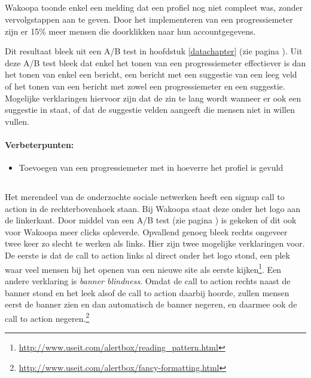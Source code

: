 \documentclass[a4paper, 10pt, pdftex]{report}
\begin{document}
    \subsection{\cite{Brouns2008}}
    \label{wak:Brouns2008}
    Wakoopa toonde enkel een melding dat een profiel nog niet compleet was, zonder vervolgstappen aan te geven. Door het implementeren van een progressiemeter zijn er 15\% meer mensen die doorklikken naar hun accountgegevens.

    Dit resultaat bleek uit een A/B test in hoofdstuk \ref{datachapter} (zie pagina \pageref{profileprogress}). Uit deze A/B test bleek dat enkel het tonen van een progressiemeter effectiever is dan het tonen van enkel een bericht, een bericht met een suggestie van een leeg veld of het tonen van een bericht met zowel een progressiemeter en een suggestie. Mogelijke verklaringen hiervoor zijn dat de zin te lang wordt wanneer er ook een suggestie in staat, of dat de suggestie velden aangeeft die mensen niet in willen vullen.

      \paragraph{\textbf{Verbeterpunten:}}
      \begin{itemize}
        \item Toevoegen van een progressiemeter met in hoeverre het profiel is gevuld
      \end{itemize}

    \subsection{\cite{Editorial2008}}
    \label{wak:Editorial2008}
    Het merendeel van de onderzochte sociale netwerken heeft een signup call to action in de rechterbovenhoek staan. Bij Wakoopa staat deze onder het logo aan de linkerkant. Door middel van een A/B test (zie pagina \pageref{ctatest}) is gekeken of dit ook voor Wakoopa meer clicks opleverde. Opvallend genoeg bleek rechts ongeveer twee keer zo slecht te werken als links. Hier zijn twee mogelijke verklaringen voor. De eerste is dat de call to action links al direct onder het logo stond, een plek waar veel mensen bij het openen van een nieuwe site als eerste kijken\footnote{\url{http://www.useit.com/alertbox/reading\_pattern.html}}. Een andere verklaring is \emph{banner blindness}. Omdat de call to action rechts naast de banner stond en het leek alsof de call to action daarbij hoorde, zullen mensen eerst de banner zien en dan automatisch de banner negeren, en daarmee ook de call to action negeren.\footnote{\url{http://www.useit.com/alertbox/fancy-formatting.html}}
\end{document}
